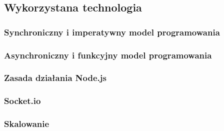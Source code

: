 \subsection{Wykorzystana technologia}

\subsubsection{Synchroniczny i imperatywny model programowania}

\subsubsection{Asynchroniczny i funkcyjny model programowania}

\subsubsection{Zasada działania Node.js}

\subsubsection{Socket.io}
\label{subsub:socketio}

\subsubsection{Skalowanie}
\label{subsub:scalability}

